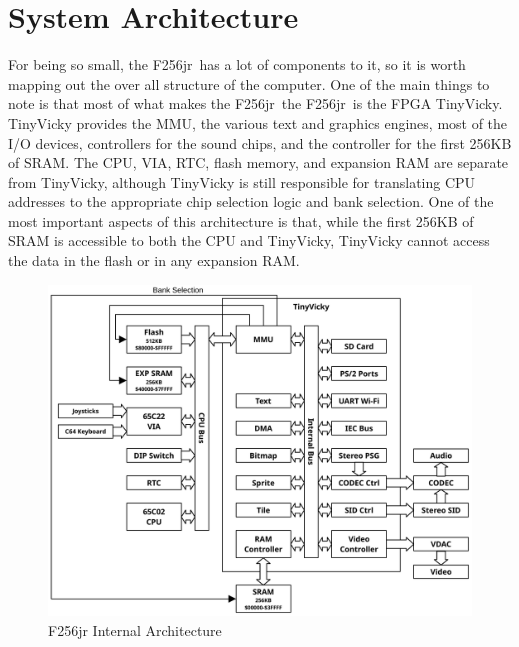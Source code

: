 \documentclass[oneside]{book}
\newcommand{\jr}{F256jr}
\begin{document}
\section{System Architecture}

For being so small, the \jr\ has a lot of components to it, so it is worth mapping out the over all structure of the computer. One of the main things to note is that most of what makes the \jr\ the \jr\ is the FPGA TinyVicky. TinyVicky provides the MMU, the various text and graphics engines, most of the I/O devices, controllers for the sound chips, and the controller for the first 256KB of SRAM. The CPU, VIA, RTC, flash memory, and expansion RAM are separate from TinyVicky, although TinyVicky is still responsible for translating CPU addresses to the appropriate chip selection logic and bank selection. One of the most important aspects of this architecture is that, while the first 256KB of SRAM is accessible to both the CPU and TinyVicky, TinyVicky cannot access the data in the flash or in any expansion RAM.

\begin{figure}[ht]
    \begin{center}
        \includegraphics[scale=0.80]{images/f256jr_layout.pdf}
    \end{center}
    \caption{F256jr Internal Architecture}
    \label{fig:arch}
\end{figure}



















\end{document}
